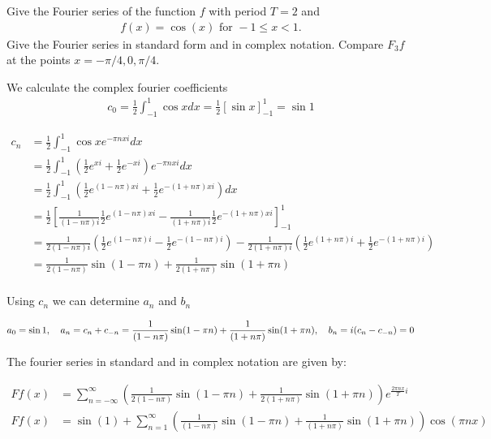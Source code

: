 \documentclass[11pt]{article}
\begin{document}
\begin{exercise}
    Give the Fourier series of the function $f$ with period $T = 2$ and 
    \begin{gather*}
        f(x) = \cos(x) \text{ for } -1 \leq x < 1.
    \end{gather*}
    Give the Fourier series in standard form and in complex notation. 
    Compare $F_3 f$ at the points $x = -\pi/4, 0, \pi/4$.
\end{exercise}
\begin{solution}    
We calculate the complex fourier coefficients 
\begin{align*}
c_0 = \frac 1 2 \int_{-1}^1 \cos x dx = \frac 1 2 [\sin x]_{-1}^1 = \sin 1
\end{align*}

\begin{align*}
c_n &= \frac 1 2 \int_{-1}^1 \cos x e^{-\pi n x i} dx\\
&= \frac 1 2 \int_{-1}^1 \left(\frac 1 2 e^{x i} + \frac 1 2 e^{-x i} \right) e^{-\pi n x i} dx\\
&= \frac 1 2 \int_{-1}^1 \left(\frac 1 2 e^{(1-n\pi)x i} + \frac 1 2 e^{-(1+n\pi)x i} \right) dx\\
&= \frac 1 2\left[\frac{1}{(1-n\pi) i}\frac 1 2 e^{(1-n\pi)x i} - \frac{1}{(1+n\pi) i}\frac 1 2 e^{-(1+n\pi)x i} \right]_{-1}^1\\
&= \frac{1}{2(1-n\pi) i}\left( \frac 1 2 e^{(1-n\pi)i}- \frac 1 2 e^{-(1-n\pi) i}\right) - \frac{1}{2(1+n\pi) i}\left( \frac 1 2 e^{(1+n\pi)i}+ \frac 1 2 e^{-(1+n\pi) i}\right)\\
&= \frac{1}{2(1-n\pi)}\sin(1-\pi n) + \frac{1}{2(1+n\pi)}\sin(1+\pi n)\\
\end{align*}

Using $c_n$ we can determine $a_n$ and $b_n$

$$
a_0 = \sin 1,\quad a_n = c_n + c_{-n} = \frac{1}{(1-n\pi)}\sin(1-\pi n) + \frac{1}{(1+n\pi)}\sin(1+\pi n)\\, \quad b_n = i(c_n - c_{-n}) = 0
$$

The fourier series in standard and in complex notation are given by:

\begin{align*}
F f(x)&=\sum_{n=-\infty}^{\infty} \left(\frac{1}{2(1-n\pi)}\sin(1-\pi n) + \frac{1}{2(1+n\pi)}\sin(1+\pi n)\right) e^{\frac{2 \pi n x}{T} i}\\
F f(x)&=\sin(1)+\sum_{n=1}^{\infty} \left(  \frac{1}{(1-n\pi) }\sin(1-\pi n) + \frac{1}{(1+n\pi)}\sin(1+\pi n) \right) \cos \left(\pi n x\right)
\end{align*}


\end{solution}
\end{document}
